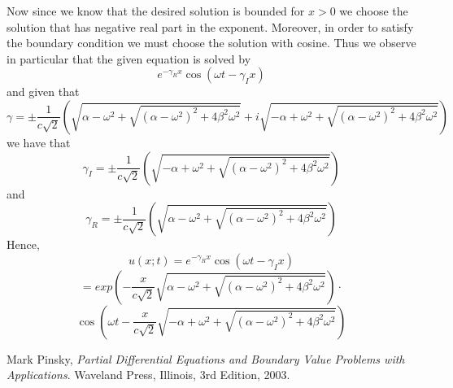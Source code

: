 \documentclass[12pt]{article}
\begin{document}
Now since we know that the desired solution is bounded for $x>0$ we choose the solution that has negative real part in the exponent. Moreover, in order to satisfy the boundary condition we must choose the solution with cosine. Thus we observe in particular that the given equation is solved by
\[e^{-\gamma_R x} \cos{(\omega t - \gamma_I x)}\]
and given that 
\[ \gamma  = \pm \frac{1}{c \sqrt{2}} \left( \sqrt{\alpha-\omega^2 + \sqrt{(\alpha-\omega^2)^2 +4\beta^2\omega^2}} + i \sqrt{- \alpha+ \omega^2 + \sqrt{(\alpha-\omega^2)^2 +4\beta^2\omega^2}} \right) \]
we have that
\[ \gamma_I  = \pm \frac{1}{c \sqrt{2}} \left(   \sqrt{- \alpha+ \omega^2 + \sqrt{(\alpha-\omega^2)^2 +4\beta^2\omega^2}} \right) \]
and
\[ \gamma_R  = \pm \frac{1}{c \sqrt{2}} \left( \sqrt{\alpha-\omega^2 + \sqrt{(\alpha-\omega^2)^2 +4\beta^2\omega^2}}  \right) \]
Hence,
\[u(x;t)=e^{-\gamma_R x} \cos{(\omega t - \gamma_I x)}\]
\[=exp\left(- \frac{x}{c \sqrt{2}}  \sqrt{\alpha-\omega^2 + \sqrt{(\alpha-\omega^2)^2 +4\beta^2\omega^2}}    \right)\cdot\]
\[\cos{ \left(\omega t -  \frac{x}{c \sqrt{2}}   \sqrt{- \alpha+ \omega^2 + \sqrt{(\alpha-\omega^2)^2 +4\beta^2\omega^2}}  \right)}\]



\begin{thebibliography}{9}

	  Mark Pinsky,
	  \emph{Partial Differential Equations and Boundary Value Problems with Applications}.
	  Waveland Press, Illinois,
	  3rd Edition,
	  2003.

\end{thebibliography}
\end{document}
